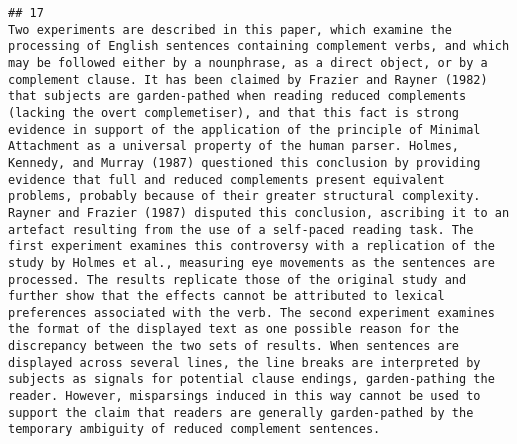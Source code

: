 \documentclass[
  english,
  man]{apa6}
\begin{document}
\begin{verbatim}
## 17                                                                                                                                                                                                                                                                                                                                                                                                                                                                                                                                                                                                                                                                                                                                                                                                                                                                                                                                                            Two experiments are described in this paper, which examine the processing of English sentences containing complement verbs, and which may be followed either by a nounphrase, as a direct object, or by a complement clause. It has been claimed by Frazier and Rayner (1982) that subjects are garden-pathed when reading reduced complements (lacking the overt complemetiser), and that this fact is strong evidence in support of the application of the principle of Minimal Attachment as a universal property of the human parser. Holmes, Kennedy, and Murray (1987) questioned this conclusion by providing evidence that full and reduced complements present equivalent problems, probably because of their greater structural complexity. Rayner and Frazier (1987) disputed this conclusion, ascribing it to an artefact resulting from the use of a self-paced reading task. The first experiment examines this controversy with a replication of the study by Holmes et al., measuring eye movements as the sentences are processed. The results replicate those of the original study and further show that the effects cannot be attributed to lexical preferences associated with the verb. The second experiment examines the format of the displayed text as one possible reason for the discrepancy between the two sets of results. When sentences are displayed across several lines, the line breaks are interpreted by subjects as signals for potential clause endings, garden-pathing the reader. However, misparsings induced in this way cannot be used to support the claim that readers are generally garden-pathed by the temporary ambiguity of reduced complement sentences.

\end{verbatim}
\end{document}
